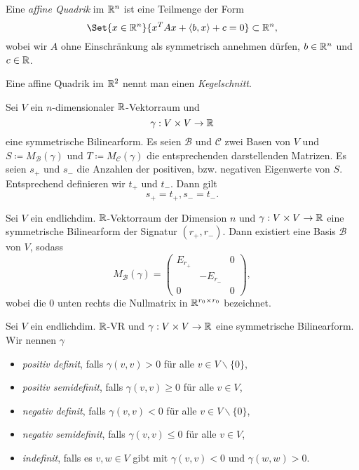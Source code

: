 \documentclass{cheat-sheet}
\newcommand{\BB}{\mathcal{B}}
\newcommand{\BC}{\mathcal{C}}
\begin{document}
\begin{definition}
Eine \emph{affine Quadrik} im $\mathbb{R}^n$ ist eine Teilmenge der Form
\[ \Set{ x \in \R^n }{ x^TAx + \langle b , x \rangle + c = 0 } \subset \R^n, \]
wobei wir $A$ ohne Einschränkung als symmetrisch annehmen dürfen, $b \in \mathbb{R}^n$ und $c \in \mathbb{R}$.
\end{definition}

\begin{definition}
Eine affine Quadrik im $\mathbb{R}^2$ nennt man einen \emph{Kegelschnitt}.
\end{definition}


\begin{satz}
Sei $V$ ein $n$-dimensionaler $\mathbb{R}$-Vektorraum und
\[ \gamma : V \times V \to \mathbb{R} \]
eine symmetrische Bilinearform. Es seien $\BB$ und $\BC$ zwei Basen von $V$ und $S \coloneqq M_\BB(\gamma)$ und $T \coloneqq M_{\BC}(\gamma)$ die entsprechenden darstellenden Matrizen. Es seien $s_+$ und $s_-$ die Anzahlen der positiven, bzw. negativen Eigenwerte von $S$. Entsprechend definieren wir $t_+$ und $t_-$. Dann gilt
\[ s_+ = t_+, s_- = t_-. \]
\end{satz}

\begin{kor}
Sei $V$ ein endlichdim. $\mathbb{R}$-Vektorraum der Dimension $n$ und $\gamma : V \times V \to \mathbb{R}$ eine symmetrische Bilinearform der Signatur $(r_+, r_-)$. Dann existiert eine Basis $\BB$ von $V$, sodass
\[ M_{\BB}(\gamma) = \begin{pmatrix}
E_{r_+} && 0 \\
& - E_{r_-} & \\
0 && 0
\end{pmatrix}, \]
wobei die $0$ unten rechts die Nullmatrix in $\mathbb{R}^{r_0 \times r_0}$ bezeichnet.
\end{kor}

\begin{definition}
Sei $V$ ein endlichdim. $\mathbb{R}$-VR und $\gamma : V \times V \to \mathbb{R}$ eine symmetrische Bilinearform. Wir nennen $\gamma$
\begin{itemize}
  \item \emph{positiv definit}, falls $\gamma(v, v) > 0$ für alle $v \in V \backslash \{ 0 \}$,
  \item \emph{positiv semidefinit}, falls $\gamma(v, v) \ge 0$ für alle $v \in V$,
  \item \emph{negativ definit}, falls $\gamma(v, v) < 0$ für alle $v \in V \backslash \{ 0 \}$,
  \item \emph{negativ semidefinit}, falls $\gamma(v, v) \le 0$ für alle $v \in V$,
  \item \emph{indefinit}, falls es $v, w \in V$ gibt mit $\gamma(v, v) < 0$ und $\gamma(w, w) > 0$.
\end{itemize}
\end{definition}
\end{document}
